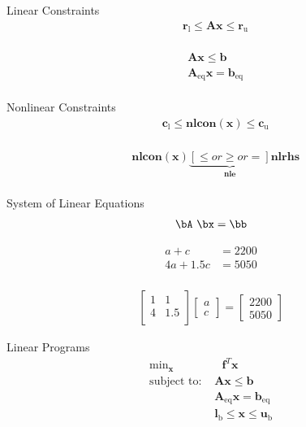 \documentclass{article}
\begin{document}
Linear Constraints
\begin{align*}
    & \mathbf{r}_{\text{l}} \le \mathbf{A}\mathbf{x} \le \mathbf{r}_{\text{u}}\\
\end{align*}

\begin{align*}
    & \mathbf{A}\mathbf{x} \le \mathbf{b}\\
    & \mathbf{A}_{\text{eq}}\mathbf{x} =  \mathbf{b}_{\text{eq}}\\
\end{align*}

Nonlinear Constraints
\begin{align*}
    & \mathbf{c}_{\text{l}} \le \mathbf{nlcon}\left(\mathbf{x}\right) \le \mathbf{c}_{\text{u}}\\
\end{align*}

\begin{align*}
    & \mathbf{nlcon}\left(\mathbf{x}\right) \underbrace{\left[\le or \ge or = \right]}_{\mathbf{nle}} \mathbf{nlrhs}\\
\end{align*}

System of Linear Equations
\begin{align*}
\text{\bA \bx} = \bb
\end{align*}

\begin{align*}
    a + c &= 2200\\
    4a + 1.5c &= 5050\\
\end{align*}

\begin{align*}
    \begin{bmatrix} 1 & 1 \\ 4 & 1.5\\\end{bmatrix}
    \begin{bmatrix} a \\ c \end{bmatrix} =
    \begin{bmatrix} 2200 \\ 5050\end{bmatrix}
\end{align*}

Linear Programs
\begin{align*}
    \text{min}_{\mathbf{x}}& \text{ } \mathbf{f}^T \mathbf{x} \\
    \mbox{subject to: }& \mathbf{A}\mathbf{x} \le \mathbf{b}\\
                       & \mathbf{A}_{\text{eq}}\mathbf{x} =  \mathbf{b}_{\text{eq}}\\
                       & \mathbf{l}_{\text{b}} \le \mathbf{x} \le \mathbf{u}_{\text{b}}\\
\end{align*}
\end{document}
